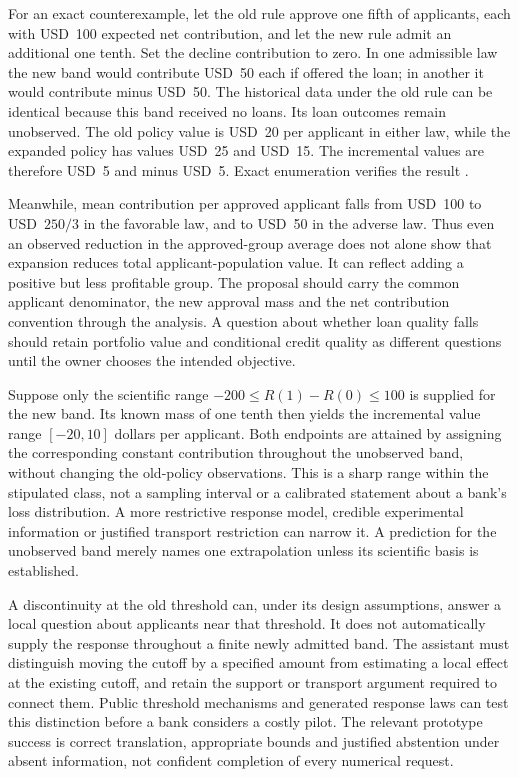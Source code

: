For an exact counterexample, let the old rule approve one fifth of applicants,
each with USD~100 expected net contribution, and let the new rule admit an
additional one tenth. Set the decline contribution to zero. In one admissible
law the new band would contribute USD~50 each if offered the loan; in another
it would contribute minus USD~50. The historical data under the old rule can
be identical because this band received no loans. Its loan outcomes remain
unobserved. The old policy value is USD~20 per applicant in either law, while
the expanded policy has values USD~25 and USD~15. The incremental values
are therefore USD~5 and minus USD~5. Exact enumeration verifies the result
\citep{exec17_l2_policy_exact}.

Meanwhile, mean contribution per approved applicant falls from USD~100 to
USD~$250/3$ in the favorable law, and to USD~50 in the adverse law. Thus even
an observed reduction in the approved-group average does not alone show that
expansion reduces total applicant-population value. It can reflect adding a
positive but less profitable group. The proposal should carry the common
applicant denominator, the new approval mass and the net contribution
convention through the analysis. A question about whether loan quality falls
should retain portfolio value and conditional credit quality as
different questions until the owner chooses the intended objective.

Suppose only the scientific range
$-200\leq R(1)-R(0)\leq100$ is supplied for the new band. Its known mass
of one tenth then yields the incremental value range $[-20,10]$ dollars
per applicant. Both endpoints are attained by assigning the corresponding
constant contribution throughout the unobserved band, without changing the
old-policy observations. This is a sharp range within the stipulated class,
not a sampling interval or a calibrated statement about a bank's loss
distribution. A more restrictive response model, credible experimental
information or justified transport restriction can narrow it. A prediction
for the unobserved band merely names one extrapolation unless its scientific
basis is established.

A discontinuity at the old threshold can, under its design assumptions,
answer a local question about applicants near that threshold. It does not
automatically supply the response throughout a finite newly admitted band.
The assistant must distinguish moving the cutoff by a specified amount
from estimating a local effect at the existing cutoff, and retain the
support or transport argument required to connect them. Public threshold
mechanisms and generated response laws can test this distinction before a
bank considers a costly pilot. The relevant prototype success is correct
translation, appropriate bounds and justified abstention under absent
information, not confident completion of every numerical request.
\label{exec17:l2-policy-end}


